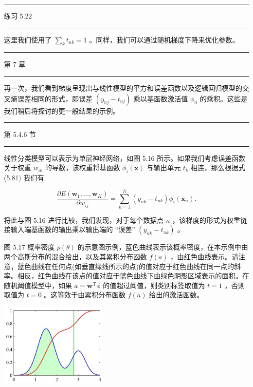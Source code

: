 \documentclass[10pt]{article}
\newcommand{\HRule}{\begin{center}\rule{0.9\linewidth}{0.2mm}\end{center}}
\begin{document}
\HRule

练习 5.22

\HRule

这里我们使用了 \(\mathop{\sum }\limits_{k}{t}_{nk} = 1\) 。同样，我们可以通过随机梯度下降来优化参数。

\HRule

第 7 章

\HRule

再一次，我们看到梯度呈现出与线性模型的平方和误差函数以及逻辑回归模型的交叉熵误差相同的形式，即误差 \(\left( {{y}_{nj} - {t}_{nj}}\right)\) 乘以基函数激活值 \({\phi }_{n}\) 的乘积。这些是我们稍后将探讨的更一般结果的示例。

\HRule

第 5.4.6 节

\HRule

线性分类模型可以表示为单层神经网络，如图 5.16 所示。如果我们考虑误差函数关于权重 \({w}_{ik}\) 的导数，该权重将基函数 \({\phi }_{i}\left( \mathbf{x}\right)\) 与输出单元 \({t}_{k}\) 相连，那么根据式 (5.81) 我们有

\[
\frac{\partial E\left( {{\mathbf{w}}_{1},\ldots ,{\mathbf{w}}_{K}}\right) }{\partial {w}_{ij}} = \mathop{\sum }\limits_{{n = 1}}^{N}\left( {{y}_{nk} - {t}_{nk}}\right) {\phi }_{i}\left( {\mathbf{x}}_{n}\right) . \tag{5.82}
\]

将此与图 5.16 进行比较，我们发现，对于每个数据点 \(n\) ，该梯度的形式为权重链接输入端基函数的输出乘以输出端的 “误差” \(\left( {{y}_{nk} - {t}_{nk}}\right)\) 。

图 5.17 概率密度 \(p\left( \theta \right)\) 的示意图示例，蓝色曲线表示该概率密度，在本示例中由两个高斯分布的混合给出，以及其累积分布函数 \(f\left( a\right)\) ，由红色曲线表示。请注意，蓝色曲线在任何点(如垂直绿线所示的点)的值对应于红色曲线在同一点的斜率。相反，红色曲线在该点的值对应于蓝色曲线下由绿色阴影区域表示的面积。在随机阈值模型中，如果 \(a = {\mathbf{w}}^{\mathrm{T}}\phi\) 的值超过阈值，则类别标签取值为 \(t = 1\) ，否则取值为 \(t = 0\) 。这等效于由累积分布函数 \(f\left( a\right)\) 给出的激活函数。

\begin{center}
\includegraphics[max width=0.4\textwidth]{images/0194e279-9b28-703a-88f4-c3ac21e2010d_182_941_361_559_434_0.jpg}
\end{center}
\hspace*{3em} 
\end{document}
